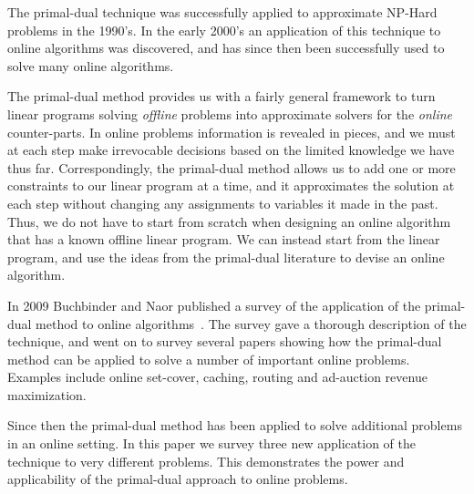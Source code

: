 The primal-dual technique was successfully applied to approximate NP-Hard problems in the 1990's.
In the early 2000's an application of this technique to online algorithms was discovered, and has since then been successfully used to solve many online algorithms.

The primal-dual method provides us with a fairly general framework to turn linear programs solving \emph{offline} problems into approximate solvers for the \emph{online} counter-parts.
In online problems information is revealed in pieces, and we must at each step make irrevocable decisions based on the limited knowledge we have thus far.
Correspondingly, the primal-dual method allows us to add one or more constraints to our linear program at a time, and it approximates the solution at each step without changing any assignments to variables it made in the past.
Thus, we do not have to start from scratch when designing an online algorithm that has a known offline linear program.
We can instead start from the linear program, and use the ideas from the primal-dual literature to devise an online algorithm.

In 2009 Buchbinder and Naor published a survey of the application of the primal-dual method to online algorithms~\cite{buchbinder09:survey}.
The survey gave a thorough description of the technique, and went on to survey several papers showing how the primal-dual method can be applied to solve a number of important online problems. 
Examples include online set-cover, caching, routing and ad-auction revenue maximization.

Since then the primal-dual method has been applied to solve additional problems in an online setting.
In this paper we survey three new application of the technique to very different problems.
This demonstrates the power and applicability of the primal-dual approach to online problems.

